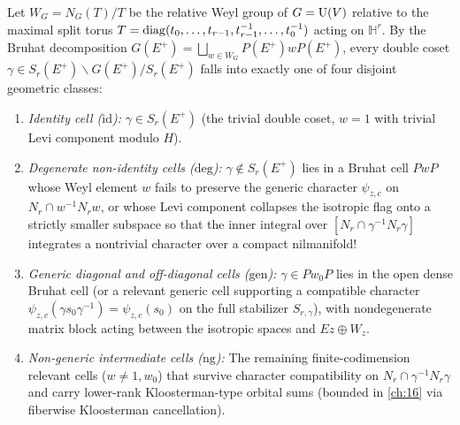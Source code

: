 \begin{definition}
\label{def:15:four-parts}
Let $W_G = N_G(T)/T$ be the relative Weyl group of $G = \mathrm{U}(V)$ relative to the maximal split torus $T = \operatorname{diag}(t_0, \dots, t_{r-1}, t_{r-1}^{-1}, \dots, t_0^{-1})$ acting on $\mathbb{H}^r$. By the Bruhat decomposition $G(E^+) = \bigsqcup_{w \in W_G} P(E^+) w P(E^+)$, every double coset $\gamma \in S_r(E^+) \backslash G(E^+) / S_r(E^+)$ falls into exactly one of four disjoint geometric classes:
\begin{enumerate}[label=\textup{(\arabic*)}]
\item \emph{Identity cell ($\mathrm{id}$):} $\gamma \in S_r(E^+)$ (the trivial double coset, $w = 1$ with trivial Levi component modulo $H$).
\item \emph{Degenerate non-identity cells ($\mathrm{deg}$):} $\gamma \notin S_r(E^+)$ lies in a Bruhat cell $P w P$ whose Weyl element $w$ fails to preserve the generic character $\psi_{z, c}$ on $N_r \cap w^{-1} N_r w$, or whose Levi component collapses the isotropic flag onto a strictly smaller subspace so that the inner integral over $[N_r \cap \gamma^{-1} N_r \gamma]$ integrates a nontrivial character over a compact nilmanifold!
\item \emph{Generic diagonal and off-diagonal cells ($\mathrm{gen}$):} $\gamma \in P w_0 P$ lies in the open dense Bruhat cell (or a relevant generic cell supporting a compatible character $\psi_{z,c}(\gamma s_0 \gamma^{-1}) = \psi_{z,c}(s_0)$ on the full stabilizer $S_{r,\gamma}$), with nondegenerate matrix block acting between the isotropic spaces and $E z \oplus W_z$.
\item \emph{Non-generic intermediate cells ($\mathrm{ng}$):} The remaining finite-codimension relevant cells ($w \neq 1, w_0$) that survive character compatibility on $N_r \cap \gamma^{-1} N_r \gamma$ and carry lower-rank Kloosterman-type orbital sums (bounded in \cref{ch:16} via fiberwise Kloosterman cancellation).
\end{enumerate}
\end{definition}

